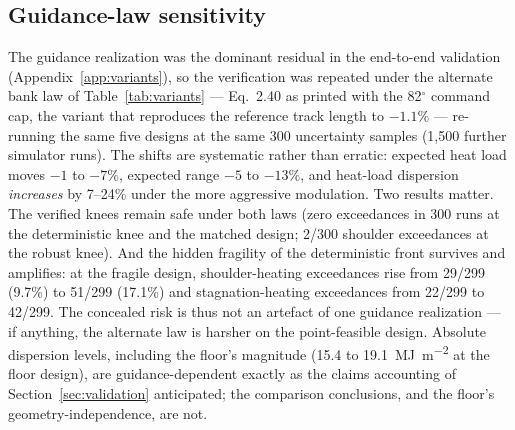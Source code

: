 \subsection{Guidance-law sensitivity}
\label{sec:guidance}

The guidance realization was the dominant residual in the end-to-end
validation (Appendix~\ref{app:variants}), so the verification was repeated
under the alternate bank law of Table~\ref{tab:variants} --- Eq.~2.40 as
printed with the 82$^\circ$ command cap, the variant that reproduces the
reference track length to $-1.1\%$ --- re-running the same five designs at
the same 300 uncertainty samples (1{,}500 further simulator runs). The
shifts are systematic rather than erratic: expected heat load moves $-1$
to $-7\%$, expected range $-5$ to $-13\%$, and heat-load dispersion
\emph{increases} by 7--24\% under the more aggressive modulation. Two
results matter. The verified knees remain safe under both laws (zero
exceedances in 300 runs at the deterministic knee and the matched design;
2/300 shoulder exceedances at the robust knee). And the hidden fragility
of the deterministic front survives and amplifies: at the fragile design,
shoulder-heating exceedances rise from 29/299 (9.7\%) to 51/299 (17.1\%)
and stagnation-heating exceedances from 22/299 to 42/299. The concealed
risk is thus not an artefact of one guidance realization --- if anything,
the alternate law is harsher on the point-feasible design. Absolute
dispersion levels, including the floor's magnitude (15.4 to
\SI{19.1}{\mega\joule\per\square\metre} at the floor design), are
guidance-dependent exactly as the claims accounting of
Section~\ref{sec:validation} anticipated; the comparison conclusions, and
the floor's geometry-independence, are not.
